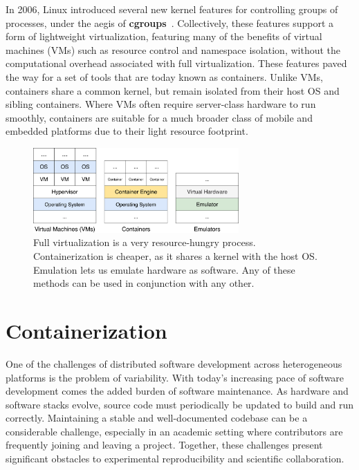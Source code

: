 \documentclass[12pt,initial,twoside,maitrise]{dms}
\numberwithin{equation}{section}
\numberwithin{table}{chapter}
\numberwithin{figure}{chapter}
\begin{document}
In 2006, Linux introduced several new kernel features for controlling groups of processes, under the aegis of \textbf{cgroups}~\citep{menage2007adding}. Collectively, these features support a form of lightweight virtualization, featuring many of the benefits of virtual machines (VMs) such as resource control and namespace isolation, without the computational overhead associated with full virtualization. These features paved the way for a set of tools that are today known as containers. Unlike VMs, containers share a common kernel, but remain isolated from their host OS and sibling containers. Where VMs often require server-class hardware to run smoothly, containers are suitable for a much broader class of mobile and embedded platforms due to their light resource footprint.

\begin{figure}
    \centering
    \includegraphics[width=0.70\textwidth]{../figures/vms_containers_emulators.png}
    \caption{Full virtualization is a very resource-hungry process. Containerization is cheaper, as it shares a kernel with the host OS. Emulation lets us emulate hardware as software. Any of these methods can be used in conjunction with any other.\vspace{-10pt}}
    \label{fig:vms_containers_emulators}
\end{figure}

\section{Containerization}\label{sec:containerization}

One of the challenges of distributed software development across heterogeneous platforms is the problem of variability. With today's increasing pace of software development comes the added burden of software maintenance. As hardware and software stacks evolve, source code must periodically be updated to build and run correctly. Maintaining a stable and well-documented codebase can be a considerable challenge, especially in an academic setting where contributors are frequently joining and leaving a project. Together, these challenges present significant obstacles to experimental reproducibility and scientific collaboration.
\end{document}
